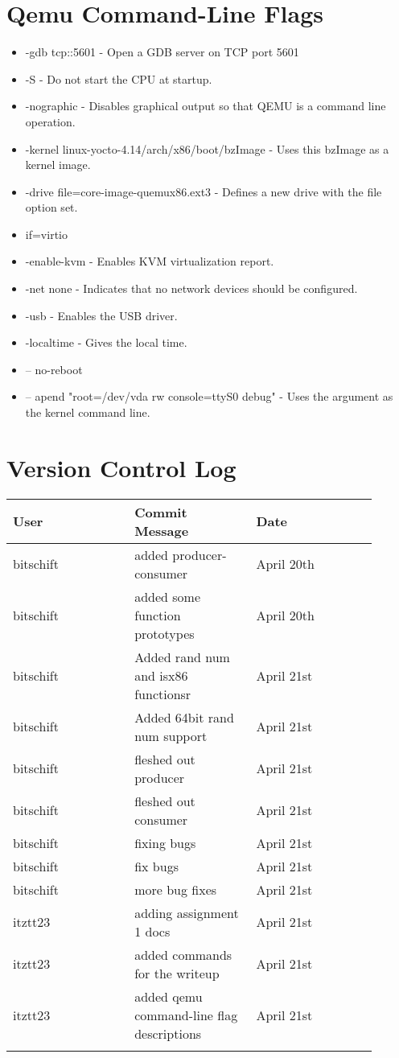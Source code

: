 \documentclass[draftclsnofoot,onecolumn,10pt,compsoc]{IEEEtran}
\begin{document}
\section{Qemu Command-Line Flags}
\begin{itemize}
	\item -gdb tcp::5601 - Open a GDB server on TCP port 5601
	\item -S - Do not start the CPU at startup.
	\item -nographic - Disables graphical output so that QEMU is a command line operation.
	\item -kernel linux-yocto-4.14/arch/x86/boot/bzImage - Uses this bzImage as a kernel image.
	\item -drive file=core-image-quemux86.ext3 - Defines a new drive with the file option set.
	\item if=virtio
	\item -enable-kvm - Enables KVM virtualization report.
	\item -net none - Indicates that no network devices should be configured.
	\item -usb - Enables the USB driver.
	\item -localtime - Gives the local time.
	\item -- no-reboot
	\item -- apend "root=/dev/vda rw console=ttyS0 debug" - Uses the argument as the kernel command line.
\end{itemize}
\section{Version Control Log}
\begin{center}
	\begin{tabular}{| p{0.3\linewidth} | p{0.3\linewidth} | p{0.3\linewidth} |}
		\hline User & Commit Message & Date\\
		\hline bitschift & added producer-consumer& April 20th\\
		\hline bitschift & added some function prototypes& April 20th\\
		\hline bitschift & 	Added rand num and isx86 functionsr& April 21st\\
		\hline bitschift & 	Added 64bit rand num support& April 21st\\
		\hline bitschift & fleshed out producer& April 21st\\
		\hline bitschift & fleshed out consumer& April 21st\\
		\hline bitschift & fixing bugs& April 21st\\
		\hline bitschift & fix bugs& April 21st\\
		\hline bitschift & more bug fixes& April 21st\\
		\hline itztt23 & adding assignment 1 docs& April 21st\\
		\hline itztt23 &added commands for the writeup& April 21st\\
		\hline itztt23 & added qemu command-line flag descriptions& April 21st\\
		\hline &&\\		
	\end{tabular}
\end{center}
\end{document}
